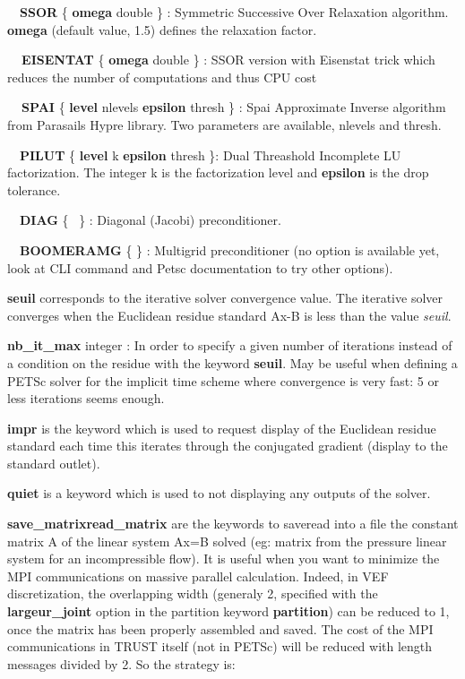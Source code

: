 \ \ \textbf{SSOR} \{ \textbf{omega} double \} : Symmetric Successive Over Relaxation algorithm.
\textbf{omega} (default value, 1.5) defines the relaxation factor. 

\textbf{\ \ EISENTAT }\{ \textbf{omega }double \} : SSOR version with Eisenstat trick which reduces the
number of computations and thus CPU cost

\textbf{\ \ SPAI }\{\textbf{ level }nlevels \textbf{epsilon} thresh \} : Spai Approximate Inverse algorithm
from Parasails Hypre library. Two parameters are available, nlevels and thresh.

\ \ \textbf{PILUT} \{ \textbf{level} k \textbf{epsilon} thresh \}: Dual Threashold Incomplete LU factorization. The
integer k is the factorization level and \textbf{epsilon} is the drop tolerance.

\ \ \textbf{DIAG} \{ \ \} : Diagonal (Jacobi) preconditioner.

\ \ \textbf{BOOMERAMG} \{ \} : Multigrid preconditioner (no option is available yet, look at CLI command and
Petsc documentation to try other options).


\bigskip

\textbf{seuil}\textit{ }corresponds to the iterative solver convergence value. The iterative solver converges when the
Euclidean residue standard {\textbar}{\textbar}Ax-B{\textbar}{\textbar} is less than the value \textit{seuil}. 


\bigskip

\textbf{nb\_it\_max} integer : In order to specify a given number of iterations instead of a condition on the residue
with the keyword \textbf{seuil}. May be useful when defining a PETSc solver for the implicit time scheme where
convergence is very fast: 5 or less iterations seems enough.


\bigskip

\textbf{impr} is the keyword which is used to request display of the Euclidean residue standard each time this iterates
through the conjugated gradient (display to the standard outlet).


\bigskip

\textbf{quiet} is a keyword which is used to not displaying any outputs of the solver.


\bigskip

\textbf{save\_matrix{\textbar}read\_matrix} are the keywords to save{\textbar}read into a file the constant matrix A of
the linear system Ax=B solved (eg: matrix from the pressure linear system for an incompressible flow). It is useful
when you want to minimize the MPI communications on massive parallel calculation. Indeed, in VEF discretization, the
overlapping width (generaly 2, specified with the \textbf{largeur\_joint} option in the partition keyword
\textbf{partition}) can be reduced to 1, once the matrix has been properly assembled and saved. The cost of the MPI
communications in TRUST itself (not in PETSc) will be reduced with length messages divided by 2. So the strategy is:

